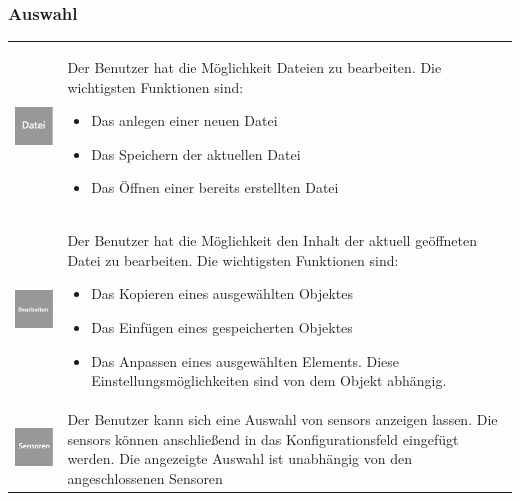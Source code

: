 \documentclass[parskip=full]{scrartcl}
\begin{document}
\subsubsection{Auswahl}

\begin{tabular}[t]{p{1cm} p{10cm}} %
	\vspace{0cm}\includegraphics[width = 1 cm]{Grafik/Datei.png} & Der Benutzer hat die Möglichkeit Dateien zu bearbeiten. Die wichtigsten Funktionen sind:
	\begin{itemize} 
		\item Das anlegen einer neuen Datei
		\item Das Speichern der aktuellen Datei
		\item Das Öffnen einer bereits erstellten Datei
	\end{itemize}\\
	\vspace{0cm}\includegraphics[width = 1 cm]{Grafik/Bearbeiten.png} & Der Benutzer hat die Möglichkeit den Inhalt der aktuell geöffneten Datei zu bearbeiten. Die wichtigsten Funktionen sind:
	\begin{itemize} 
		\item Das Kopieren eines ausgewählten Objektes
		\item Das Einfügen eines gespeicherten Objektes
		\item Das Anpassen eines ausgewählten Elements. Diese Einstellungsmöglichkeiten sind von dem Objekt abhängig.
	\end{itemize}\\
	\vspace{0cm}\includegraphics[width = 1 cm]{Grafik/Sensor.png} & Der Benutzer kann sich eine Auswahl von \glspl{sensor} anzeigen lassen. Die \glspl{sensor} können anschließend in das Konfigurationsfeld eingefügt werden. Die angezeigte Auswahl ist unabhängig von den angeschlossenen Sensoren\newline\\
\end{tabular}
\end{document}
